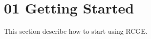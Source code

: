 \chapter{01 Getting Started }
\hypertarget{guide01}{}\label{guide01}
This section describe how to start using RCGE.